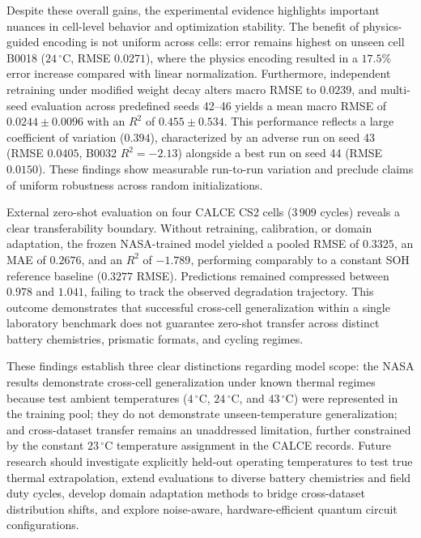 \documentclass[a4paper,fleqn]{cas-sc}
\begin{document}
Despite these overall gains, the experimental evidence highlights important nuances in cell-level behavior and optimization stability. The benefit of physics-guided encoding is not uniform across cells: error remains highest on unseen cell B0018 ($24\,^\circ\mathrm{C}$, RMSE $0.0271$), where the physics encoding resulted in a $17.5\%$ error increase compared with linear normalization. Furthermore, independent retraining under modified weight decay alters macro RMSE to $0.0239$, and multi-seed evaluation across predefined seeds 42--46 yields a mean macro RMSE of $0.0244 \pm 0.0096$ with an $R^2$ of $0.455 \pm 0.534$. This performance reflects a large coefficient of variation ($0.394$), characterized by an adverse run on seed 43 (RMSE $0.0405$, B0032 $R^2 = -2.13$) alongside a best run on seed 44 (RMSE $0.0150$). These findings show measurable run-to-run variation and preclude claims of uniform robustness across random initializations.

External zero-shot evaluation on four CALCE CS2 cells ($3\,909$ cycles) reveals a clear transferability boundary. Without retraining, calibration, or domain adaptation, the frozen NASA-trained model yielded a pooled RMSE of $0.3325$, an MAE of $0.2676$, and an $R^2$ of $-1.789$, performing comparably to a constant SOH reference baseline ($0.3277$ RMSE). Predictions remained compressed between $0.978$ and $1.041$, failing to track the observed degradation trajectory. This outcome demonstrates that successful cross-cell generalization within a single laboratory benchmark does not guarantee zero-shot transfer across distinct battery chemistries, prismatic formats, and cycling regimes.

These findings establish three clear distinctions regarding model scope: the NASA results demonstrate cross-cell generalization under known thermal regimes because test ambient temperatures ($4\,^\circ\mathrm{C}$, $24\,^\circ\mathrm{C}$, and $43\,^\circ\mathrm{C}$) were represented in the training pool; they do not demonstrate unseen-temperature generalization; and cross-dataset transfer remains an unaddressed limitation, further constrained by the constant $23\,^\circ\mathrm{C}$ temperature assignment in the CALCE records. Future research should investigate explicitly held-out operating temperatures to test true thermal extrapolation, extend evaluations to diverse battery chemistries and field duty cycles, develop domain adaptation methods to bridge cross-dataset distribution shifts, and explore noise-aware, hardware-efficient quantum circuit configurations.
\end{document}
